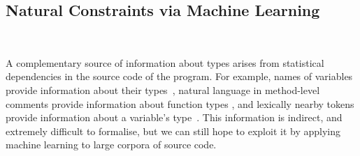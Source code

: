 \documentclass[acmsmall, review, anonymous]{acmart}\settopmatter{printfolios=true,printccs=false,printacmref=false}
\newcommand{\qqpi}[2]{[\![#2]\!]_{#1}}
\begin{document}



\subsection{Natural Constraints via Machine Learning}~\label{ssec:natcon}

A complementary source of information about types arises from statistical dependencies
in the source code of the program.  For example, names of variables provide
information about their types~\cite{xu16}, natural language in
method-level comments provide information about function types \cite{malik19},
and lexically nearby tokens provide information
about a variable's type~\cite{wei20,hellendoorn18}.
This information is indirect, and extremely difficult to formalise,
but we can still hope to exploit it by applying machine learning
to large corpora of source code.
\end{document}

